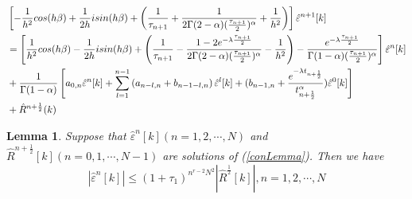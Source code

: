 \documentclass[10pt, reqno]{amsart}
\newtheorem{lmm}{\bf Lemma}
\newenvironment{lemma}{\begin{lmm}}{\end{lmm}}
\theoremstyle{remark}
\theoremstyle{definition}
\numberwithin{table}{section}
\begin{document}
\begin{align}
     &\left[-\frac{1}{h^2}cos(h\beta)+\frac{1}{2h}isin(h\beta)+\left(\frac{1}{\tau_{n+1}}+\frac{1}{2\Gamma(2-\alpha)(\frac{\tau_{n+1}}{2})^\alpha}+\frac{1}{h^2}\right) \right]\hat{\varepsilon}^{n+1}[k]\notag \\
    &=\left[\frac{1}{h^2}cos(h\beta)-\frac{1}{2h}isin(h\beta)+\left(\frac{1}{\tau_{n+1}}-\frac{1-2e^{-\lambda \frac{\tau_{n+1}}{2}}}{2\Gamma(2-\alpha)(\frac{\tau_{n+1}}{2})^\alpha}-\frac{1}{h^2}\right) -\frac{e^{-\lambda \frac{\tau_{n+1}}{2}}}{\Gamma(1-\alpha)(\frac{\tau_{n+1}}{2})^\alpha}\right]\hat{\varepsilon}^{n}[k] \notag\\
    &+\frac{1}{\Gamma(1-\alpha)}\left[a_{0, n} \hat{\varepsilon}^{n}[k]+\sum\limits_{l=1}^{n-1} \left(a_{n-l, n}+b_{n-1-l, n}\right) \hat{\varepsilon}^{l}[k]+(b_{n-1, n}+\frac{e^{-\lambda t_{n+\frac{1}{2}}}}{t_{n+\frac{1}{2}}^\alpha}) \hat{\varepsilon}^{0}[k]\right]\notag\\
    &+\hat{R}^{n+\frac{1}{2}}(k) \label{conLemma}
\end{align}
\begin{lemma}\label{convergele}
    Suppose that $\hat{\varepsilon}^n [k] (n = 1,  2, \cdots,  N)$ and $\hat{R}^{n+\frac{1}{2}}[k](n = 0,  1, \cdots,  N-1)$ are solutions of (\ref{conLemma}).  Then we have 
    $$
    |\hat{\varepsilon}^n[k]|\leq (1+\tau_1)^{n^{r-2}N^{2}}|\hat{R}^{\frac{1}{2}}[k]|, n = 1,  2, \cdots,  N$$
\end{lemma}
\end{document}

